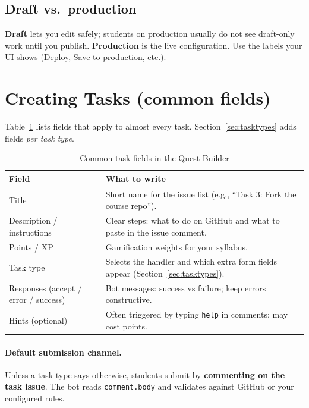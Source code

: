 \documentclass[11pt,a4paper]{article}
\begin{document}
\subsection{Draft vs.\ production}

\textbf{Draft} lets you edit safely; students on production usually do not see draft-only work until you publish. \textbf{Production} is the live configuration. Use the labels your UI shows (Deploy, Save to production, etc.).

\section{Creating Tasks (common fields)}

Table~\ref{tab:taskfields} lists fields that apply to almost every task. Section~\ref{sec:tasktypes} adds fields \emph{per task type}.

\begin{table}[htbp]
  \centering
  \caption{Common task fields in the Quest Builder}
  \label{tab:taskfields}
  \begin{tabularx}{\linewidth}{@{}lX@{}}
    \toprule
    \textbf{Field} & \textbf{What to write} \\
    \midrule
    Title &
      Short name for the issue list (e.g., ``Task 3: Fork the course repo''). \\
    Description / instructions &
      Clear steps: what to do on GitHub and what to paste in the issue comment. \\
    Points / XP &
      Gamification weights for your syllabus. \\
    Task type &
      Selects the handler and which extra form fields appear (Section~\ref{sec:tasktypes}). \\
    Responses (accept / error / success) &
      Bot messages: success vs failure; keep errors constructive. \\
    Hints (optional) &
      Often triggered by typing \texttt{help} in comments; may cost points. \\
    \bottomrule
  \end{tabularx}
\end{table}

\paragraph{Default submission channel.}
Unless a task type says otherwise, students submit by \textbf{commenting on the task issue}. The bot reads \texttt{comment.body} and validates against GitHub or your configured rules.
\end{document}

